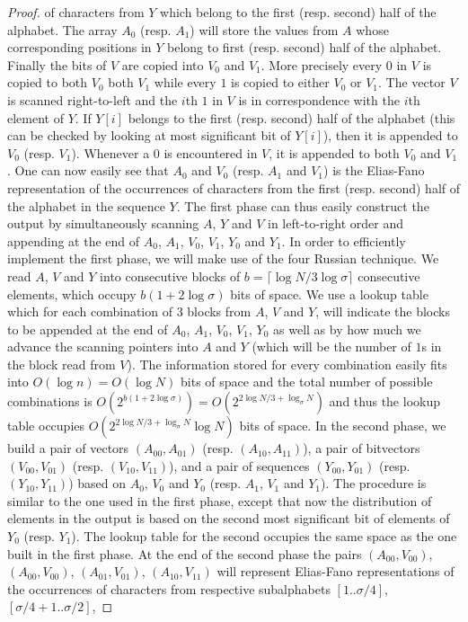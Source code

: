 \documentclass[11pt,runningheads]{llncs}
\begin{document}
\begin{proof}
of characters from $Y$ which belong to the first (resp. second) half of the alphabet. The array $A_0$ (resp. $A_1$) will store the values from $A$ whose corresponding positions in $Y$ belong to first (resp. second) half of the alphabet. Finally the bits of $V$ are copied into $V_0$ and $V_1$. More precisely every $0$ in $V$ is copied to both $V_0$ both $V_1$ while every $1$ is copied to either $V_0$ or $V_1$. The vector $V$ is scanned right-to-left and the $i$th $1$ in $V$ is in correspondence with the $i$th element of $Y$. If $Y[i]$ belongs to the first (resp. second) half of the alphabet (this can be checked by looking at most significant bit of $Y[i]$), then it is appended to $V_0$ (resp. $V_1$). Whenever a $0$ is encountered in $V$, it is appended to both $V_0$ and $V_1$. One can now easily see that $A_0$ and $V_0$ (resp. $A_1$ and $V_1$) is the Elias-Fano representation of the occurrences of characters from the first (resp. second) half of the alphabet in the sequence $Y$. The first phase can thus easily construct the output by simultaneously scanning $A$, $Y$ and $V$ in left-to-right order and appending at the end of $A_0$, $ A_1$, $V_0$, $V_1$, $Y_0$ and $Y_1$. In order to efficiently implement the first phase, we will make use of the four Russian technique. We read $A$, $V$ and $Y$ into consecutive blocks of $b=\lceil\log N/3\log\sigma\rceil$ consecutive elements, which occupy $b(1+2\log\sigma)$ bits of space. We use a lookup table which for each combination of $3$ blocks from $A$, $V$ and $Y$, will indicate the blocks to be appended at the end of $A_0$, $A_1$, $V_0$, $V_1$, $Y_0$ as well as by how much we advance the scanning pointers into $A$ and $Y$ (which will be the number of $1$s in the block read from $V$). The information stored for every combination easily fits into $O(\log n)=O(\log N)$ bits of space and the total number of possible combinations 
is $O(2^{b(1+2\log\sigma)})=O(2^{2\log N/3+\log_\sigma N})$ and thus the lookup table occupies $O(2^{2\log N/3+\log_\sigma N}\log N)$ bits of space. In the second phase, we build a pair of vectors $(A_{00},A_{01})$ (resp. $(A_{10},A_{11})$), 
a pair of bitvectors $(V_{00},V_{01})$ (resp. $(V_{10},V_{11})$), and a pair of sequences $(Y_{00},Y_{01})$ (resp. $(Y_{10},Y_{11})$) based on $A_0$, $V_0$ and $Y_0$ (resp. $A_1$, $V_1$ and $Y_1$). The procedure is similar to the one  used in the first phase, except that now the distribution of elements in the output is based on the second most significant bit of elements of $Y_0$ (resp. $Y_1$). The lookup table for the second occupies the same space as the one built in the first phase. At the end of the second phase the pairs $(A_{00},V_{00})$, $(A_{00},V_{00})$, $(A_{01},V_{01})$, $(A_{10},V_{11})$  will represent Elias-Fano representations of the occurrences of characters from respective subalphabets $[1..\sigma/4]$, $[\sigma/4+1..\sigma/2]$, 

\end{proof}
\end{document}
